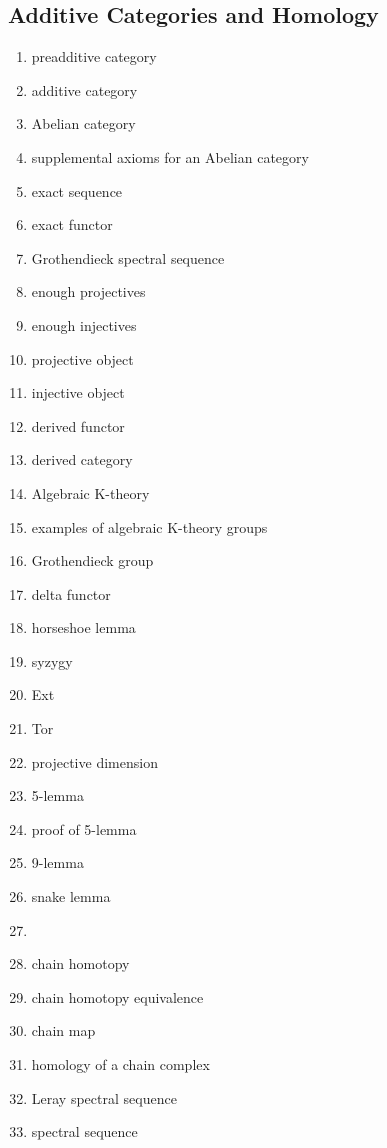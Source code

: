 \documentclass[12pt]{article}
\begin{document}
\begin{multicols}{2}
\section{Additive Categories and Homology}
\begin{enumerate}
\item preadditive category
\item additive category
\item Abelian category
\item supplemental axioms for an Abelian category
\item exact sequence
\item exact functor
\item Grothendieck spectral sequence
\item enough projectives 
\item enough injectives
\item projective object
\item injective object 
\item derived functor
\item derived category
\item Algebraic K-theory
\item examples of algebraic K-theory groups
\item Grothendieck group
\item delta functor
\item horseshoe lemma
\item syzygy
\item Ext
\item Tor
\item projective dimension
\item 5-lemma
\item proof of 5-lemma
\item 9-lemma
\item snake lemma
\item {}
\item chain homotopy
\item chain homotopy equivalence
\item chain map
\item homology of a chain complex
\item Leray spectral sequence
\item spectral sequence
\end{enumerate}


\end{multicols}
\end{document}
